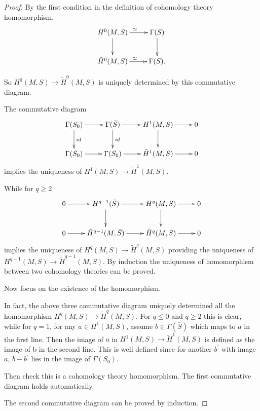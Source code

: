 \documentclass[twoside]{article}
\begin{document}
\begin{proof}
  By the first condition in the definition of cohomology theory homomorphism, \begin{equation*}
      \xymatrix{
      H^0(M,S)\ar[d]\ar[r]^\simeq&\Gamma(S)\ar[d]\\
      \tilde{H}^0(M,S)\ar[r]^\simeq&\Gamma(S).\\
      }
    \end{equation*}


   So  $H^0(M,S)\to \tilde{H}^0(M,S)$ is uniquely determined by this commutative diagram.

  The commutative diagram \begin{equation*}
    \xymatrix{
    \Gamma(S_0)\ar[r]\ar[d]^{id}&\Gamma(\bar{S})\ar[r]\ar[d]^{id}&H^1(M,S)\ar[d]\ar[r]&0\\
    \Gamma(S_0)\ar[r]&\Gamma(S_0)\ar[r]&\tilde{H}^1(M,S)\ar[r]&0\\
    }
  \end{equation*}implies the uniqueness of $H^1(M,S)\to \tilde{H}^1(M,S)$.

  While for $q\geq 2 $ \begin{equation*}
    \xymatrix{
   0\ar[r]&H^{q-1}(\bar{S})\ar[r]\ar[d]&H^q(M,S)\ar[d]\ar[r]&0\\
   0\ar[r]&\tilde{H}^{q-1}(M,\bar{S})\ar[r]&\tilde{H}^q(M,S)\ar[r]&0\\
    }
  \end{equation*}
  implies the uniqueness of $H^q(M,S)\to \tilde{H}^q(M,S)$ providing the uniqueness of $H^{q-1}(M,S)\to \tilde{H}^{q-1}(M,S)$. By induction  the uniqueness of homomorphism between two cohomology theories can be  proved.

  Now focus on  the existence of the homomorphism.

  In fact, the above three commutative diagram uniquely determined all the homomorphism $H^q(M,S)\to \tilde{H}^q(M,S)$. For $q\leq 0 $ and $q\geq 2$ this is clear, while for $q=1$, for any $a\in H^1(M,S)$, assume $b\in \Gamma(\bar{S})$ which maps to $a$ in the first line. Then  the image of $a$ in $H^1(M,S)\to \tilde{H}^1(M,S)$ is defined as the image of b in the second line. This is well defined since for another $b^\prime$ with image $a$, $b-b^\prime$ lies in the image of $\Gamma(S_0)$.

  Then check this is a cohomology theory homomorphism. The first commutative diagram holds automatically.

  The second commutative diagram can be proved by induction.


\end{proof}
\end{document}

